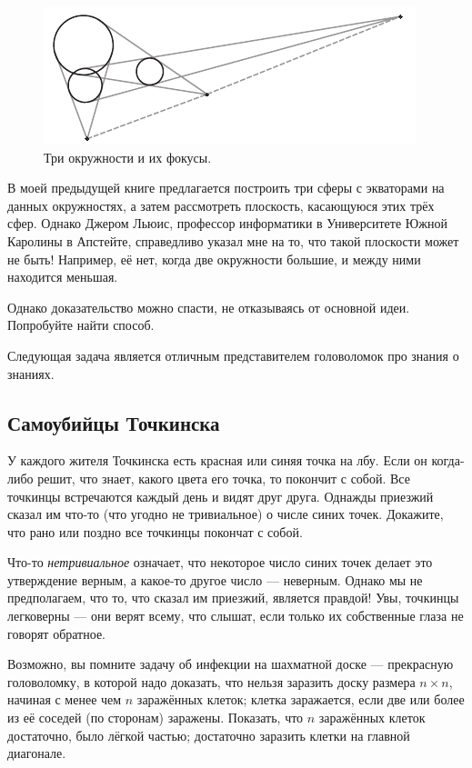 \begin{figure}[h!]
\centering
\includegraphics[scale=1]{pics/3circs}
\caption{Три окружности и их фокусы.}
\label{pic:3circ}
\end{figure}

В моей предыдущей книге \cite{59} предлагается построить три сферы с экваторами на данных окружностях, а затем рассмотреть плоскость, касающуюся этих трёх сфер.
Однако Джером Льюис, профессор информатики в Университете Южной Каролины в Апстейте, справедливо указал мне на то, что такой плоскости может не быть!
Например, её нет, когда две окружности большие, и между ними находится меньшая.

Однако доказательство можно спасти, не отказываясь от основной идеи.
Попробуйте найти способ.

\medskip

Следующая задача является отличным представителем головоломок про знания о знаниях.

\subsection*{Самоубийцы Точкинска}

У каждого жителя Точкинска есть красная или синяя точка на лбу.
Если он когда-либо решит, что знает, какого цвета его точка, то покончит с собой.
Все точкинцы встречаются каждый день и видят друг друга.
Однажды приезжий сказал им что-то (что угодно не тривиальное) о числе синих точек.
Докажите, что рано или поздно все точкинцы покончат с собой.

 Что-то \emph{нетривиальное} означает, что некоторое число синих точек делает это утверждение верным, а какое-то другое число --- неверным.
Однако мы не предполагаем, что то, что сказал им приезжий, является правдой!
Увы, точкинцы легковерны --- они верят всему, что слышат, если только их собственные глаза не говорят обратное.

\medskip

Возможно, вы помните задачу об инфекции на шахматной доске --- прекрасную головоломку, в которой надо доказать, что нельзя заразить доску размера $n \times n$, начиная с менее чем $n$ заражённых клеток;
клетка заражается, если две или более из её соседей (по сторонам) заражены.
Показать, что $n$ заражённых клеток достаточно, было лёгкой частью; достаточно заразить клетки на главной диагонале.

